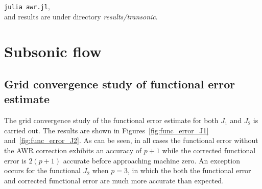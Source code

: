 \documentclass[a4paper]{article}
\begin{document}
\hspace{1cm}\texttt{julia awr.jl}, \\
and results are under directory \textit{results/transonic}.

\section{Subsonic flow}
\subsection{Grid convergence study of functional error estimate}
The grid convergence study of the functional error estimate for both $J_1$ and $J_2$ is carried out. The results are shown in Figures~\ref{fig:func_error_J1} and~\ref{fig:func_error_J2}. As can be seen, in all cases the functional error without the AWR correction exhibits an accuracy of $p+1$ while the corrected functional error is $2(p+1)$ accurate before approaching machine zero. An exception occurs for the functional $J_2$ when $p=3$, in which the both the functional error and corrected functional error are much more accurate than expected. 
\end{document}
